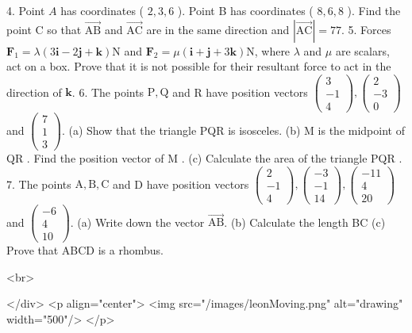 4. Point $A$ has coordinates ( $2,3,6$ ). Point B has coordinates ( $8,6,8$ ). Find the point C so that $\overrightarrow{\mathrm{AB}}$ and $\overrightarrow{\mathrm{AC}}$ are in the same direction and $|\overrightarrow{\mathrm{AC}}|=77$.
5. Forces $\mathbf{F}_{1}=\lambda(3 \mathbf{i}-2 \mathbf{j}+\mathbf{k}) \mathrm{N}$ and $\mathbf{F}_{2}=\mu(\mathbf{i}+\mathbf{j}+3 \mathbf{k}) \mathrm{N}$, where $\lambda$ and $\mu$ are scalars, act on a box. Prove that it is not possible for their resultant force to act in the direction of $\mathbf{k}$.
6. The points $\mathrm{P}, \mathrm{Q}$ and R have position vectors $\left(\begin{array}{c}3 \\ -1 \\ 4\end{array}\right),\left(\begin{array}{c}2 \\ -3 \\ 0\end{array}\right)$ and $\left(\begin{array}{l}7 \\ 1 \\ 3\end{array}\right)$.
(a) Show that the triangle PQR is isosceles.
(b) M is the midpoint of QR . Find the position vector of M .
(c) Calculate the area of the triangle PQR .
7. The points $\mathrm{A}, \mathrm{B}, \mathrm{C}$ and D have position vectors $\left(\begin{array}{c}2 \\ -1 \\ 4\end{array}\right),\left(\begin{array}{l}-3 \\ -1 \\ 14\end{array}\right),\left(\begin{array}{c}-11 \\ 4 \\ 20\end{array}\right)$ and $\left(\begin{array}{c}-6 \\ 4 \\ 10\end{array}\right)$.
(a) Write down the vector $\overrightarrow{\mathrm{AB}}$.
(b) Calculate the length BC
(c) Prove that ABCD is a rhombus.

<br>

</div>
<p align="center">
<img src="/images/leonMoving.png" alt="drawing" width="500"/>
</p>
